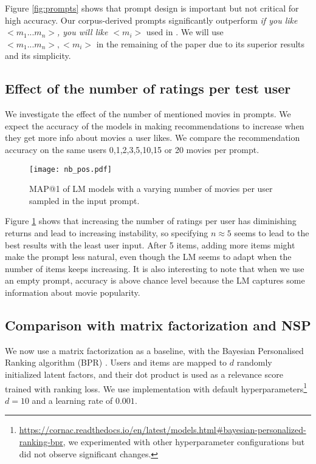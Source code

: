 \documentclass[runningheads]{llncs}
\begin{document}
Figure \ref{fig:prompts} shows that prompt design is important but not critical for high accuracy. Our corpus-derived prompts significantly outperform \textit{if you like ${<}m_1...m_n{>}$, you will like ${<}m_i{>}$} used in \cite{Penha20}. We will use ${<}m_1...m_n{>},{<}m_i{>}$ in the remaining of the paper due to its superior results and its simplicity.

\subsection{Effect of the number of ratings per test user}
We investigate the effect of the number of mentioned movies in prompts. We expect the accuracy of the models in making recommendations to increase when they get more info about movies a user likes. We compare the recommendation accuracy on the same users 0,1,2,3,5,10,15 or 20 movies per prompt. 

\begin{figure}\centering
    \texttt{[image: nb\_pos.pdf]}
    \caption{MAP@1 of LM models with a varying number of movies per user sampled in the input prompt.}
    \label{ratingsperuser}
\end{figure}

Figure \ref{ratingsperuser} shows that increasing the number of ratings per user has diminishing returns and lead to increasing instability, so specifying $n\approx 5$ seems to lead to the best results with the least user input. After 5 items, adding more items might make the prompt less natural, even though the LM seems to adapt when the number of items keeps increasing. It is also interesting to note that when we use an empty prompt, accuracy is above chance level because the LM captures some information about movie popularity.


\subsection{Comparison with matrix factorization and NSP}

We now use a matrix factorization as a baseline, with the Bayesian Personalised Ranking algorithm (BPR) \cite{rendle2012bpr}. Users and items are mapped to $d$ randomly initialized latent factors, and their dot product is used as a relevance score trained with ranking loss. We use \cite{salah2020cornac} implementation with default hyperparameters\footnote{\url{https://cornac.readthedocs.io/en/latest/models.html\#bayesian-personalized-ranking-bpr}, we experimented with other hyperparameter configurations but did not observe significant changes.} $d=10$ and a learning rate of $0.001$.
\end{document}

